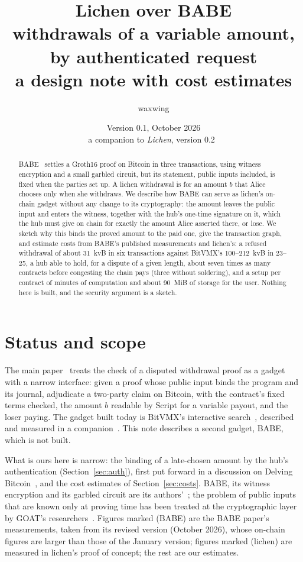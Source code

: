 \documentclass[11pt]{article}
\title{\textbf{Lichen over BABE}\\withdrawals of a variable amount, by authenticated request\\[2pt]\large a design note with cost estimates}
\author{waxwing}
\date{Version 0.1, October 2026\\[2pt]\small a companion to \emph{Lichen}, version 0.2~\cite{lichen}}
\begin{document}
\maketitle

\begin{abstract}
BABE~\cite{babe} settles a Groth16 proof on Bitcoin in three
transactions, using witness encryption and a small garbled circuit, but
its statement, public inputs included, is fixed when the parties set up.
A lichen withdrawal is for an amount $b$ that Alice chooses only when she
withdraws. We describe how BABE can serve as lichen's on-chain gadget
without any change to its cryptography: the amount leaves the public
input and enters the witness, together with the hub's one-time signature
on it, which the hub must give on chain for exactly the amount Alice
asserted there, or lose. We sketch why this binds the proved amount to
the paid one, give the transaction graph, and estimate costs from BABE's
published measurements and lichen's: a refused withdrawal of about
31~kvB in six transactions against BitVMX's 100--212~kvB in 23--25, a
hub able to hold, for a dispute of a given length, about seven times as
many contracts before congesting the chain pays (three without
soldering), and a
setup per contract of minutes of computation and about 90~MiB of storage
for the user. Nothing here is built, and the security argument is a
sketch.
\end{abstract}

\tableofcontents

\section{Status and scope}
\label{sec:status}

The main paper~\cite{lichen} treats the check of a disputed withdrawal
proof as a gadget with a narrow interface: given a proof whose public
input binds the program and its journal, adjudicate a two-party claim
on Bitcoin, with the contract's fixed terms checked, the amount $b$
readable by Script for a variable payout, and the loser paying. The
gadget built today is BitVMX's interactive search~\cite{bitvmx},
described and measured in a companion~\cite{lichenbitvmx}. This note
describes a second gadget, BABE, which is not built.

What is ours here is narrow: the binding of a late-chosen amount by the
hub's authentication (Section~\ref{sec:auth}), first put forward in a
discussion on Delving Bitcoin~\cite{delving}, and the cost estimates of
Section~\ref{sec:costs}. BABE, its witness encryption and its garbled
circuit are its authors'~\cite{babe,gkpw24,argo}; the problem of public
inputs that are known only at proving time has been treated at the
cryptographic layer by GOAT's researchers~\cite{goat}. Figures marked
(BABE) are the BABE paper's measurements, taken from its revised version
(October 2026), whose on-chain figures are larger than those of the
January version; figures marked (lichen) are measured in lichen's proof
of concept; the rest are our estimates.
\end{document}
